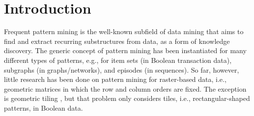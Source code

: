 \documentclass{llncs}
\begin{document}
\section{Introduction}

Frequent pattern mining \cite{aggarwal2014fpm} is the well-known subfield of data mining that aims to find and extract recurring substructures from data, as a form of knowledge discovery. The generic concept of pattern mining has been instantiated for many different types of patterns, e.g., for item sets (in Boolean transaction data), subgraphs (in graphs/networks), and episodes (in sequences). So far, however, little research has been done on pattern mining for raster-based data, i.e., geometric matrices in which the row and column orders are fixed. The exception is geometric tiling \cite{gionis2004tiles,tatti2012stijl}, but that problem only considers tiles, i.e., rectangular-shaped patterns, in Boolean data.
\end{document}
